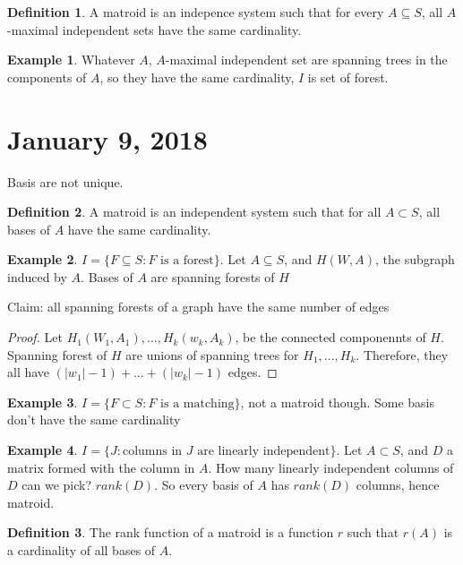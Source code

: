 \documentclass{article}
\theoremstyle{plain}
\theoremstyle{definition}
\newtheorem{eg}{Example}
\newtheorem{defn}{Definition}
\begin{document}
\begin{defn}
    A matroid is an indepence system such that for every $A\subseteq S$, all
    $A$-maximal independent sets have the same cardinality.
\end{defn}

\begin{eg}
    Whatever $A$, $A$-maximal independent set are spanning trees in the components of
    $A$, so they have the same cardinality, $I$ is set of forest.
\end{eg}

\section{January 9, 2018}

Basis are not unique.

\begin{defn}
    A matroid is an independent system such that for all $A\subset S$, all bases of
    $A$ have the same cardinality.
\end{defn}

\begin{eg}
    $I = \{F\subseteq S: \text{$F$ is a forest}\}$. Let $A\subseteq S$, and $H(W, A)$, the
    subgraph induced by $A$. Bases of $A$ are spanning forests of $H$
\end{eg}

Claim: all spanning forests of a graph have the same number of edges
\begin{proof}
    Let $H_1(W_1, A_1), ..., H_k(w_k, A_k)$, be the connected componennts of $H$. Spanning
    forest of $H$ are unions of spanning trees for $H_1, ..., H_k$. Therefore,
    they all have $(|w_1| - 1)+ ...+ (|w_k| -1)$ edges.
\end{proof}

\begin{eg}
    $I = \{F\subset S: F \text{ is a matching}\}$, not a matroid though. Some basis
    don't have the same cardinality
\end{eg}

\begin{eg}
    $I = \{J: \text{columns in $J$ are linearly independent}\}$. Let $A\subset S$, and
    $D$ a matrix formed with the column in $A$. How many linearly independent columns of
    $D$ can we pick? $rank(D)$. So every basis of $A$ has $rank(D)$ columns, hence matroid.
\end{eg}

\begin{defn}
    The rank function of a matroid is a function $r$ such that $r(A)$ is a cardinality of
    all bases of $A$.
\end{defn}
\end{document}
